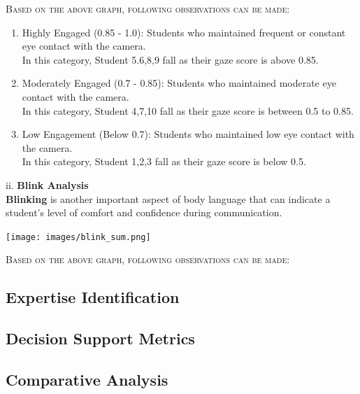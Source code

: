 \documentclass{article}
\begin{document}
\textsc{Based on the above graph, following observations can be made:}
\begin{enumerate}
    \item Highly Engaged (0.85 - 1.0): Students who maintained frequent or constant eye contact with the camera.\\
    {
        In this category, Student 5.6,8,9 fall as their gaze score is above 0.85.
    }
    \item Moderately Engaged (0.7 - 0.85): Students who maintained moderate eye contact with the camera.\\
    {
        In this category, Student 4,7,10 fall as their gaze score is between 0.5 to 0.85.
    }
    \item Low Engagement (Below 0.7): Students who maintained low eye contact with the camera.\\
    {
        In this category, Student 1,2,3 fall as their gaze score is below 0.5.
    }
\end{enumerate}

ii. \textbf{Blink Analysis}\\
\textbf{Blinking} is another important aspect of body language that can indicate a student's level of comfort and confidence during communication.\\

\begin{center}
    \texttt{[image: images/blink\_sum.png]}
\end{center}

\textsc{Based on the above graph, following observations can be made:}

\subsection{Expertise Identification}

\subsection{Decision Support Metrics}

\subsection{Comparative Analysis}
\end{document}
